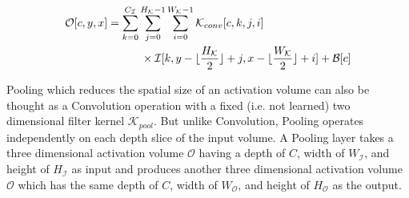 \begin{equation}
\label{eqn:conv_operator}
\begin{split}
\mathcal{O}[c,y,x] &= \sum_{k=0}^{C_{\mathcal{I}}} \sum_{j=0}^{H_\mathcal{K}-1} \sum_{i=0}^{W_\mathcal{K}-1} \mathcal{K}_{conv}[c, k, j, i] \\ & \quad \quad \quad \times \mathcal{I}[k,y-\lfloor\frac{H_\mathcal{K}}{2}\rfloor+j,x-\lfloor\frac{W_\mathcal{K}}{2}\rfloor+i] + \mathcal{B}[c]
\end{split}
\end{equation}

Pooling which reduces the spatial size of an activation volume can also be thought as a Convolution operation with a fixed (i.e. not learned) two dimensional filter kernel $\mathcal{K}_{pool}$.
But unlike Convolution, Pooling operates independently on each depth slice of the input volume.
A Pooling layer takes a three dimensional activation volume $\mathcal{O}$ having a depth of $C$, width of $W_{\mathcal{I}}$, and height of $H_{\mathcal{I}}$ as input and produces another three dimensional activation volume $\mathcal{O}$ which has the same depth of $C$, width of $W_{\mathcal{O}}$, and height of $H_{\mathcal{O}}$ as the output.




